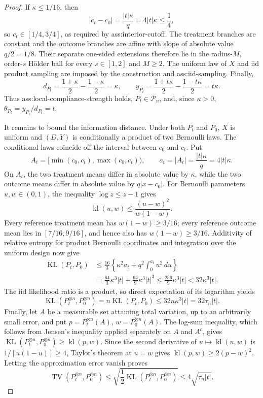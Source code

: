 \documentclass{article}
\begin{document}
\begin{proof}
If \(\kappa\le1/16\), then
\[
 |c_t-c_0|=\frac{|t|\kappa}{q}=4|t|\kappa\le\frac14,
\]
so \(c_t\in[1/4,3/4]\), as required by ass:interior-cutoff.  The treatment branches are constant and the outcome branches are affine with slope of absolute value \(q/2=1/8\).  Their separate one-sided extensions therefore lie in the radius-\(M\), order-\(s\) H\"older ball for every \(s\in[1,2]\) and \(M\ge2\).  The uniform law of \(X\) and iid product sampling are imposed by the construction and ass:iid-sampling.  Finally,
\[
 d_{P_t}=\frac{1+\kappa}{2}-\frac{1-\kappa}{2}=\kappa,
 \qquad
 y_{P_t}=\frac{1+t\kappa}{2}-\frac{1-t\kappa}{2}=t\kappa.
\]
Thus ass:local-compliance-strength holds, \(P_t\in\mathcal P_n\), and, since \(\kappa>0\), \(\theta_{P_t}=y_{P_t}/d_{P_t}=t\).

It remains to bound the information distance.  Under both \(P_t\) and \(P_0\), \(X\) is uniform and \((D,Y)\) is conditionally a product of two Bernoulli laws.  The conditional laws coincide off the interval between \(c_0\) and \(c_t\).  Put
\[
 A_t=[\min(c_0,c_t),\max(c_0,c_t)),\qquad
 a_t=|A_t|=\frac{|t|\kappa}{q}=4|t|\kappa.
\]
On \(A_t\), the two treatment means differ in absolute value by \(\kappa\), while the two outcome means differ in absolute value by \(q|x-c_0|\).  For Bernoulli parameters \(u,w\in(0,1)\), the inequality \(\log z\le z-1\) gives
\[
 \operatorname{kl}(u,w)
 \le \frac{(u-w)^2}{w(1-w)}.
\]
Every reference treatment mean has \(w(1-w)\ge3/16\); every reference outcome mean lies in \([7/16,9/16]\), and hence also has \(w(1-w)\ge3/16\).  Additivity of relative entropy for product Bernoulli coordinates and integration over the uniform design now give
\[
\begin{aligned}
 \operatorname{KL}(P_t,P_0)
 &\le \frac{16}{3}\left\{\kappa^2 a_t
      +q^2\int_0^{a_t}u^2\,du\right\}\\
 &=\frac{64}{3}\kappa^3|t|+\frac{64}{9}\kappa^3|t|^3
 \le \frac{256}{9}\kappa^3|t|
 <32\kappa^3|t|.
\end{aligned}
\]
The iid likelihood ratio is a product, so direct expectation of its logarithm yields
\[
 \operatorname{KL}(P_t^{\otimes n},P_0^{\otimes n})
 =n\operatorname{KL}(P_t,P_0)
 \le32n\kappa^3|t|=32\tau_n|t|.
\]
Finally, let \(A\) be a measurable set attaining total variation, up to an arbitrarily small error, and put \(p=P_t^{\otimes n}(A)\), \(w=P_0^{\otimes n}(A)\).  The log-sum inequality, which follows from Jensen's inequality applied separately on \(A\) and \(A^c\), gives \(\operatorname{KL}(P_t^{\otimes n},P_0^{\otimes n})\ge\operatorname{kl}(p,w)\).  Since the second derivative of \(u\mapsto\operatorname{kl}(u,w)\) is \(1/[u(1-u)]\ge4\), Taylor's theorem at \(u=w\) gives \(\operatorname{kl}(p,w)\ge2(p-w)^2\).  Letting the approximation error vanish proves
\[
 \operatorname{TV}(P_t^{\otimes n},P_0^{\otimes n})
 \le\sqrt{\frac12\operatorname{KL}(P_t^{\otimes n},P_0^{\otimes n})}
 \le4\sqrt{\tau_n|t|}.
\]
\end{proof}
\end{document}
